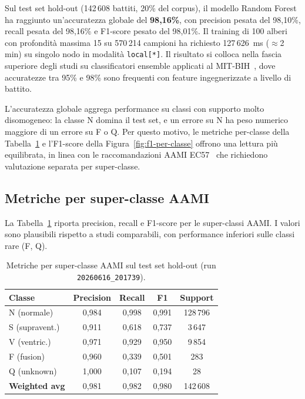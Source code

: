 Sul test set hold-out (142\,608 battiti, 20\% del corpus), il modello Random Forest ha raggiunto un'accuratezza globale del \textbf{98,16\%}, con precision pesata del 98,10\%, recall pesata del 98,16\% e F1-score pesato del 98,01\%.
Il training di 100 alberi con profondità massima 15 su 570\,214 campioni ha richiesto 127\,626~ms ($\approx$2\,min) su singolo nodo in modalità \texttt{local[*]}.
Il risultato si colloca nella fascia superiore degli studi su classificatori ensemble applicati al MIT-BIH~\cite{breiman2001random,moody2001impact}, dove accuratezze tra 95\% e 98\% sono frequenti con feature ingegnerizzate a livello di battito.

L'accuratezza globale aggrega performance su classi con supporto molto disomogeneo: la classe N domina il test set, e un errore su N ha peso numerico maggiore di un errore su F o Q.
Per questo motivo, le metriche per-classe della Tabella~\ref{tab:metriche-classe} e l'F1-score della Figura~\ref{fig:f1-per-classe} offrono una lettura più equilibrata, in linea con le raccomandazioni AAMI EC57~\cite{aami2012ec57} che richiedono valutazione separata per super-classe.

\subsection{Metriche per super-classe AAMI}

La Tabella~\ref{tab:metriche-classe} riporta precision, recall e F1-score per le super-classi AAMI.
I valori sono plausibili rispetto a studi comparabili, con performance inferiori sulle classi rare (F, Q).

\begin{table}[H]
  \centering
  \caption{Metriche per super-classe AAMI sul test set hold-out (run \texttt{20260616\_201739}).}
  \label{tab:metriche-classe}
  \begin{tabular}{@{}lcccc@{}}
    \toprule
    \textbf{Classe} & \textbf{Precision} & \textbf{Recall} & \textbf{F1} & \textbf{Support} \\
    \midrule
    N (normale)    & 0,984 & 0,998 & 0,991 & 128\,796 \\
    S (supravent.) & 0,911 & 0,618 & 0,737 & 3\,647 \\
    V (ventric.)   & 0,971 & 0,929 & 0,950 & 9\,854 \\
    F (fusion)     & 0,960 & 0,339 & 0,501 & 283 \\
    Q (unknown)    & 1,000 & 0,107 & 0,194 & 28 \\
    \midrule
    \textbf{Weighted avg} & 0,981 & 0,982 & 0,980 & 142\,608 \\
    \bottomrule
  \end{tabular}
\end{table}

